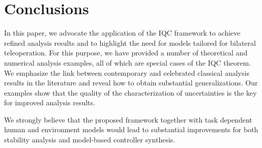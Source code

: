 \section{Conclusions}

In this paper, we advocate the application of the IQC framework to achieve refined analysis results and to highlight the need for models tailored for bilateral teleoperation. For this purpose, we have provided a number of theoretical and numerical analysis examples, all of which are special cases of the IQC theorem. We emphasize the link between contemporary and celebrated classical analysis results in the literature and reveal how to obtain substantial generalizations. Our examples show that the quality of the characterization of uncertainties is the key for improved analysis results.


We strongly believe that the proposed framework together with task dependent human and environment models would lead to substantial improvements for both stability analysis and model-based controller synthesis.

